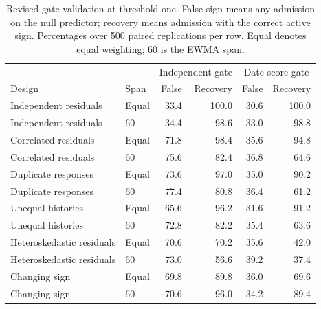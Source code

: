 \begin{table}[htbp]
    \centering\small
    \caption{Revised gate validation at threshold one. False sign means any admission
    on the null predictor; recovery means admission with the correct active sign.
    Percentages over 500 paired replications per row. Equal denotes equal weighting;
    60 is the EWMA span.}\label{tab:revised-gate}
    \begin{tabular}{llrrrr}\toprule
     & & \multicolumn{2}{c}{Independent gate} & \multicolumn{2}{c}{Date-score gate}\\
    Design & Span & False & Recovery & False & Recovery\\\midrule
    Independent residuals & Equal & 33.4 & 100.0 & 30.6 & 100.0 \\
Independent residuals & 60 & 34.4 & 98.6 & 33.0 & 98.8 \\
Correlated residuals & Equal & 71.8 & 98.4 & 35.6 & 94.8 \\
Correlated residuals & 60 & 75.6 & 82.4 & 36.8 & 64.6 \\
Duplicate responses & Equal & 73.6 & 97.0 & 35.0 & 90.2 \\
Duplicate responses & 60 & 77.4 & 80.8 & 36.4 & 61.2 \\
Unequal histories & Equal & 65.6 & 96.2 & 31.6 & 91.2 \\
Unequal histories & 60 & 72.8 & 82.2 & 35.4 & 63.6 \\
Heteroskedastic residuals & Equal & 70.6 & 70.2 & 35.6 & 42.0 \\
Heteroskedastic residuals & 60 & 73.0 & 56.6 & 39.2 & 37.4 \\
Changing sign & Equal & 69.8 & 89.8 & 36.0 & 69.6 \\
Changing sign & 60 & 70.6 & 96.0 & 34.2 & 89.4 \\
    \bottomrule\end{tabular}
    \end{table}
    